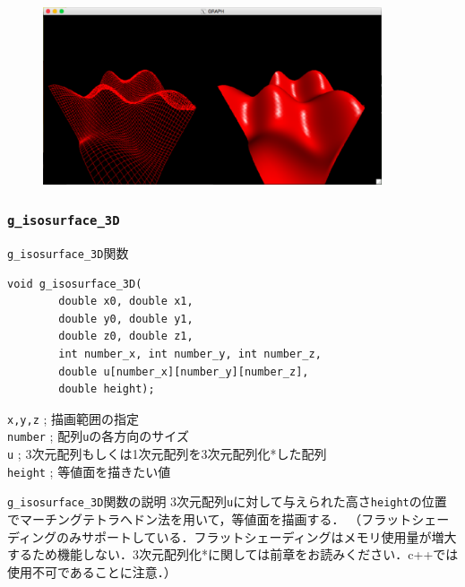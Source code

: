 \documentclass[platex,a4paper,12pt]{jsarticle}%
\begin{document}
\begin{figure}[htb]
	\includegraphics[width=100mm]{./Figures/eps/Canvas_g_bird_view.eps}
\end{figure}




\clearpage
\subsubsection{\texttt{g\_isosurface\_3D}}

\begin{itembox}[l]{\texttt{g\_isosurface\_3D}関数}
\begin{verbatim}
void g_isosurface_3D(
        double x0, double x1,
        double y0, double y1,        
        double z0, double z1,
        int number_x, int number_y, int number_z,
        double u[number_x][number_y][number_z],
        double height);
\end{verbatim}
\verb|x,y,z| ; 描画範囲の指定\\
\verb|number| ; 配列\verb|u|の各方向のサイズ\\
\verb|u| ; 3次元配列もしくは1次元配列を3次元配列化*した配列\\
\verb|height| ; 等値面を描きたい値\\
\end{itembox}

\begin{itembox}[l]{\texttt{g\_isosurface\_3D}関数の説明}
3次元配列\verb|u|に対して与えられた高さ\verb|height|の位置でマーチングテトラへドン法を用いて，等値面を描画する．
（フラットシェーディングのみサポートしている．フラットシェーディングはメモリ使用量が増大するため機能しない．3次元配列化*に関しては前章をお読みください．c++では使用不可であることに注意．）
\end{itembox}
\end{document}
